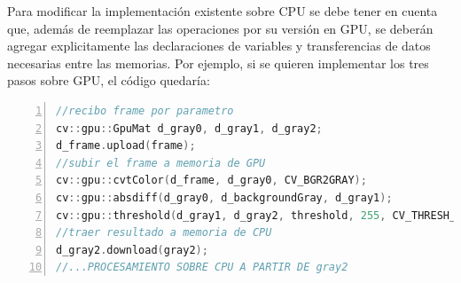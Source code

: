 \documentclass[a4paper,10pt]{report}
\begin{document}
 
Para modificar la implementación existente sobre CPU se debe tener en cuenta que, además de reemplazar las operaciones por su versión en GPU, se deberán agregar explicitamente las declaraciones de variables y transferencias de datos necesarias entre las memorias.
Por ejemplo, si se quieren implementar los tres pasos sobre GPU, el código quedaría:

\begin{lstlisting}[caption={Ejemplo de método process sobre GPU},frame=bt,columns=fullflexible,numbers=left,backgroundcolor=\color{LemonChiffon1},basicstyle=\small,keywordstyle=\ttfamily\small,language=C++,stringstyle=\ttfamily,breaklines=true,xleftmargin=0.5em,xrightmargin=0pt,aboveskip=\bigskipamount,belowskip=\bigskipamount]
//recibo frame por parametro
cv::gpu::GpuMat d_gray0, d_gray1, d_gray2;
d_frame.upload(frame);
//subir el frame a memoria de GPU
cv::gpu::cvtColor(d_frame, d_gray0, CV_BGR2GRAY);
cv::gpu::absdiff(d_gray0, d_backgroundGray, d_gray1); 
cv::gpu::threshold(d_gray1, d_gray2, threshold, 255, CV_THRESH_BINARY);
//traer resultado a memoria de CPU
d_gray2.download(gray2);
//...PROCESAMIENTO SOBRE CPU A PARTIR DE gray2
\end{lstlisting}




%  
%  


 
 
 
 
\end{document}
